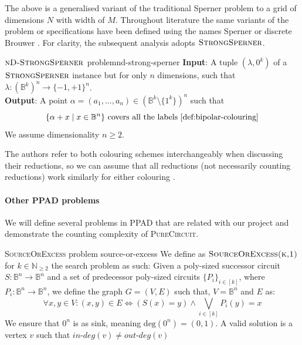 The above is a generalised variant of the traditional Sperner problem to
a grid of dimensions $N$ with width of $M$.
Throughout literature the same variants of the problem or specifications
have been defined using the names Sperner or discrete Brouwer \cite{chen_SettlingComplexityComputing_2009, chen_Complexity2DDiscrete_2009, daskalakis_ComplexityComputingNash_2006, deligkas_PureCircuitTightInapproximability_2024}.
For clarity, the subsequent analysis adopts $\textsc{StrongSperner}$.

\begin{definitionbox}{$\textnormal{\textsc{nD-StrongSperner}}$ problem}{nd-strong-sperner}
    \textbf{Input}: A tuple $(\lambda,0^k)$ of a $\textnormal{\textsc{StrongSperner}}$ instance but for only $n$ dimensions, such that
    $\lambda : (\mathbb{B}^k)^n \to \{-1, +1\}^n$.\\
    \textbf{Output}: A point $\alpha = (a_1, \hdots, a_n) \in (\mathbb{B}^k \setminus \{1^k\})^n$ such that
    $$
        \{\alpha + x \mid x \in \mathbb{B}^n\} \text{ covers all the labels \ref{def:bipolar-colouring}}
    $$
    We assume dimensionality $n \geq 2$.
\end{definitionbox}

The authors refer to both colouring schemes interchangeably when discussing their reductions,
so we can assume that all reductions (not necessarily counting reductions) work similarly for either colouring
\cite{chen_SettlingComplexityComputing_2009, deligkas_PureCircuitTightInapproximability_2024, daskalakis_ComplexityComputingNash_2006, chen_Complexity2DDiscrete_2009}.


\paragraph{Other PPAD problems}

We will define several problems in \textsc{PPAD} that are related with our project
and demonstrate the counting complexity of \textsc{PureCircuit}.

\begin{definitionbox}{\textsc{SourceOrExcess} problem \cite{ikenmeyer_WhatWhatNot_2022}}{source-or-excess}
    We define as $\textsc{SourceOrExcess(k,1)}$ for $k \in \mathbb{N}_{\geq 2}$
    the search problem as such: Given a poly-sized successor circuit $S : \mathbb{B}^n \to \mathbb{B}^n$
    and a set of predecessor poly-sized circuits $\{P_i\}_{i \in [k]}$, where $P_i : \mathbb{B}^n \to \mathbb{B}^n$, we define
    the graph $G = (V,E)$ such that, $V = \mathbb{B}^n$ and $E$ as:
    $$
        \forall x, y \in V: (x,y) \in E \iff (S(x) = y) \wedge \bigvee_{i \in [k]} P_i(y) = x
    $$
    We ensure that $0^n$ is as sink, meaning $\text{deg}(0^n) = (0,1)$.
    A valid solution is a vertex $v$ such that $\textit{in-deg}(v) \neq \textit{out-deg}(v)$
\end{definitionbox}

